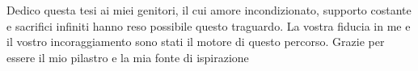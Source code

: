
%

\begin{ntdedicatory}

Dedico questa tesi ai miei genitori, il cui amore incondizionato, supporto costante e sacrifici infiniti hanno reso possibile questo traguardo. La vostra fiducia in me e il vostro incoraggiamento sono stati il motore di questo percorso. Grazie per essere il mio pilastro e la mia fonte di ispirazione

\end{ntdedicatory}
